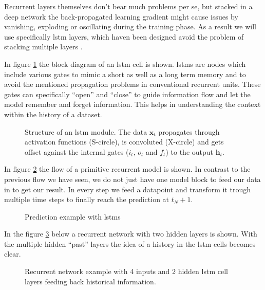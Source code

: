 	Recurrent layers themselves don't bear much problems per se, but stacked in a deep network the back-propagated learning gradient might cause issues by vanishing, exploding or oscillating during the training phase. As a result we will use specifically \ac{lstm} layers, which haven been designed avoid the problem of stacking multiple layers \cite{lstm}.
	
	In figure \ref{f:lstm_module} the block diagram of an \ac{lstm} cell is shown. \acp{lstm} are nodes which include various gates to mimic a short as well as a long term memory and to avoid the mentioned propagation problems in conventional recurrent units. These gates can specifically \enquote{open} and \enquote{close} to guide information flow and let the model remember and forget information. This helps in understanding the context within the history of a dataset.

	\begin{figure}[htb]
	\centering
	
	\caption{Structure of an \ac{lstm} module. The data $\mathbf{x}_t$ propagates through activation functions (S-circle), is convoluted (X-circle) and gets offset against the internal gates ($i_t$, $o_t$ and $f_t$) to the output $\mathbf{h}_t$.}
	\label{f:lstm_module}
	\end{figure}

	In figure \ref{f:lstm_prediction} the flow of a primitive recurrent model is shown. In contrast to the previous flow we have seen, we do not just have one model block to feed our data in to get our result. In every step we feed a datapoint and transform it trough multiple time steps to finally reach the prediction at $t_N+1$.
	
	\begin{figure}[htb]
	\centering
	
	\caption{Prediction example with \acfp{lstm}}
	\label{f:lstm_prediction}
	\end{figure}
		
	In the figure \ref{f:rnn_example} below a recurrent network with two hidden layers is shown. With the multiple hidden \enquote{past} layers the idea of a history in the \ac{lstm} cells becomes clear.

	\begin{figure}[htb]
	\centering
	
	\caption{Recurrent network example with 4 inputs and 2 hidden \ac{lstm} cell layers feeding back historical information.}
	\label{f:rnn_example}
	\end{figure}
	
